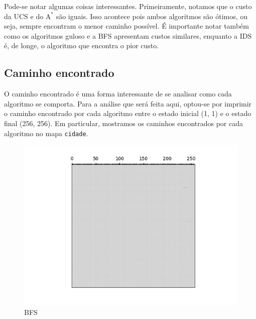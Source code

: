 \documentclass{article}
\begin{document}
Pode-se notar algumas coisas interessantes. Primeiramente, notamos que o custo da UCS e do \(\text{A}^*\) são iguais. Isso acontece pois ambos algoritmos são ótimos, ou seja, sempre encontram o menor caminho possível.
É importante notar também como os algoritmos guloso e a BFS apresentam custos similares, enquanto a IDS é, de longe,
o algoritmo que encontra o pior custo.

\subsection{Caminho encontrado}

O caminho encontrado é uma forma interessante de se analisar como cada algoritmo se comporta. Para a análise que será feita aqui, optou-se por imprimir o caminho encontrado por cada algoritmo entre o estado inicial
(1, 1) e o estado final (256, 256). Em particular, mostramos os caminhos encontrados por cada algoritmo no mapa \texttt{cidade}.

\begin{figure}[H]
	\centering
	\includegraphics[width=1.0\textwidth]{../images/paths/BFS.png}
	\caption{BFS}
\end{figure}
\end{document}
